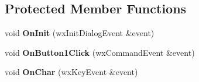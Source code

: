 \subsection*{Protected Member Functions}
\begin{DoxyCompactItemize}
\item 
\mbox{\label{classCAboutBox_a7b8a029f1bc14a171489139ecf3b9efd}} 
void {\bfseries On\+Init} (wx\+Init\+Dialog\+Event \&event)
\item 
\mbox{\label{classCAboutBox_a4ceb56a1d2dcdf7ebdbc2db415abcf00}} 
void {\bfseries On\+Button1\+Click} (wx\+Command\+Event \&event)
\item 
\mbox{\label{classCAboutBox_a8ba8776862019cee447e0cce4cfa58df}} 
void {\bfseries On\+Char} (wx\+Key\+Event \&event)
\end{DoxyCompactItemize}
